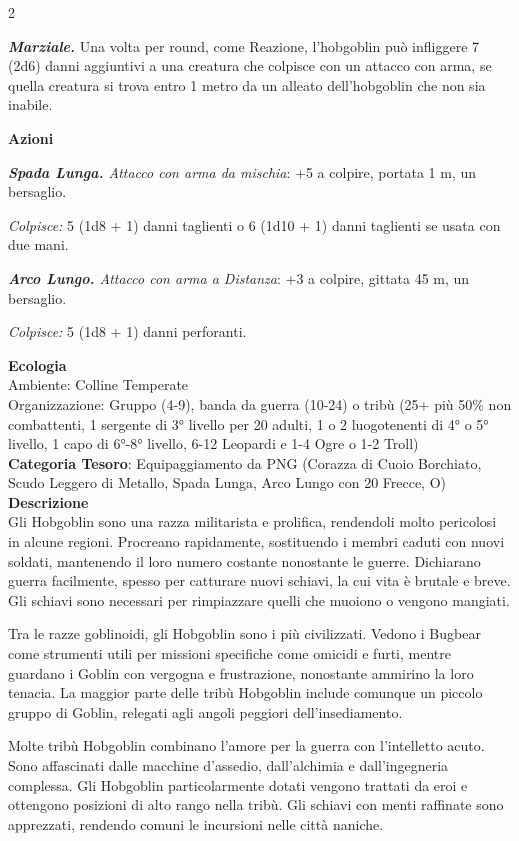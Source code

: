 \begin{multicols}{2}
{\emph{\textbf{Marziale.}} Una volta per round, come Reazione, l'hobgoblin può infliggere 7 (2d6) danni aggiuntivi a una creatura che colpisce con un attacco con arma, se quella creatura si trova entro 1 metro da un alleato dell'hobgoblin che non sia inabile.

\textbf{Azioni}

\emph{\textbf{Spada Lunga.} Attacco con arma da mischia}: +5 a colpire, portata 1 m, un bersaglio.

\emph{Colpisce:} 5 (1d8 + 1) danni taglienti o 6 (1d10 + 1) danni taglienti se usata con due mani.

\emph{\textbf{Arco Lungo.} Attacco con arma a Distanza}: +3 a colpire, gittata 45 m, un bersaglio.

\emph{Colpisce:} 5 (1d8 + 1) danni perforanti.

\textbf{Ecologia}\\
Ambiente: Colline Temperate\\
Organizzazione: Gruppo (4-9), banda da guerra (10-24) o tribù (25+ più 50\% non combattenti, 1 sergente di 3° livello per 20 adulti, 1 o 2 luogotenenti di 4° o 5° livello, 1 capo di 6°-8° livello, 6-12 Leopardi e 1-4 Ogre o 1-2 Troll)\\
\textbf{Categoria Tesoro}: Equipaggiamento da PNG (Corazza di Cuoio Borchiato, Scudo Leggero di Metallo, Spada Lunga, Arco Lungo con 20 Frecce, O)\\
\textbf{Descrizione}\\
Gli Hobgoblin sono una razza militarista e prolifica, rendendoli molto pericolosi in alcune regioni. Procreano rapidamente, sostituendo i membri caduti con nuovi soldati, mantenendo il loro numero costante nonostante le guerre. Dichiarano guerra facilmente, spesso per catturare nuovi schiavi, la cui vita è brutale e breve. Gli schiavi sono necessari per rimpiazzare quelli che muoiono o vengono mangiati.

Tra le razze goblinoidi, gli Hobgoblin sono i più civilizzati. Vedono i Bugbear come strumenti utili per missioni specifiche come omicidi e furti, mentre guardano i Goblin con vergogna e frustrazione, nonostante ammirino la loro tenacia. La maggior parte delle tribù Hobgoblin include comunque un piccolo gruppo di Goblin, relegati agli angoli peggiori dell'insediamento.

Molte tribù Hobgoblin combinano l'amore per la guerra con l'intelletto acuto. Sono affascinati dalle macchine d'assedio, dall'alchimia e dall'ingegneria complessa. Gli Hobgoblin particolarmente dotati vengono trattati da eroi e ottengono posizioni di alto rango nella tribù. Gli schiavi con menti raffinate sono apprezzati, rendendo comuni le incursioni nelle città naniche.

}
\end{multicols}
